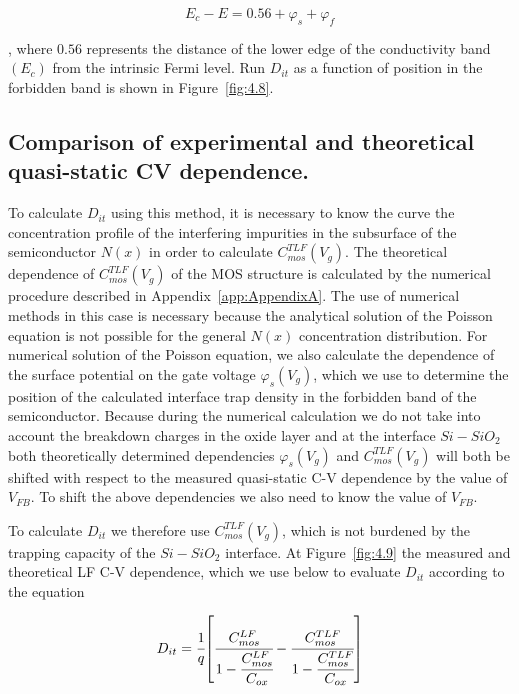 \begin{equation}\label{eq:4.17}
  E_{c} - E = 0.56 + \varphi_{s} + \varphi_{f}
\end{equation}

, where $0.56$ represents the distance of the lower edge of the
conductivity band $(E_{c})$ from the intrinsic Fermi level. Run
$D_{it}$ as a function of position in the forbidden band is shown
in Figure~\ref{fig:4.8}.

\newpage
\subsection{Comparison of experimental and theoretical quasi-static CV dependence.}\label{sec:4.2.2}

To calculate $D_{it}$ using this method, it is necessary to know the
curve the concentration profile of the interfering impurities in
the subsurface of the semiconductor $N(x)$ in order to calculate
$C_{mos}^{TLF}(V_{g})$. The theoretical dependence of
$C_{mos}^{TLF}(V_{g})$ of the MOS structure is calculated by the
numerical procedure described in Appendix~\ref{app:AppendixA}.  The
use of numerical methods in this case is necessary because the
analytical solution of the Poisson equation is not possible for the
general $N(x)$ concentration distribution.  For numerical solution of
the Poisson equation, we also calculate the dependence of the surface
potential on the gate voltage $\varphi_{s}(V_{g})$, which we use to
determine the position of the calculated interface trap density in the
forbidden band of the semiconductor.  Because during the numerical
calculation we do not take into account the breakdown charges in the
oxide layer and at the interface $Si-SiO_{2}$ both theoretically
determined dependencies $\varphi_{s}(V_{g})$ and
$C_{mos}^{TLF}(V_{g})$ will both be shifted with respect to the
measured quasi-static C-V dependence by the value of $V_{FB}$. To
shift the above dependencies we also need to know the value of
$V_{FB}$.

\par To calculate $D_{it}$ we therefore use $C_{mos}^{TLF}(V_{g})$,
which is not burdened by the trapping capacity of the $Si-SiO_{2}$
interface. At Figure~\ref{fig:4.9} the measured and theoretical LF C-V
dependence, which we use below to evaluate $D_{it}$ according to the
equation

\begin{equation}\label{eq:4.18}
  D_{it} = {\cfrac{1}{q}} {\left[\cfrac{C_{mos}^{LF}}{1-\cfrac{C_{mos}^{LF}}{C_{ox}}}-\cfrac{C_{mos}^{TLF}}{1-\cfrac{C_{mos}^{TLF}}{C_{ox}}}\right]}
\end{equation}

